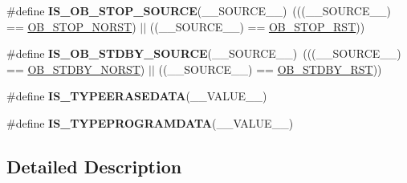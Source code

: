 \begin{DoxyCompactItemize}
\item 
\hypertarget{group___f_l_a_s_h_ex___private___macros_ga619ba079dedc08221f54a91a0fd84001}{\#define {\bfseries I\-S\-\_\-\-O\-B\-\_\-\-S\-T\-O\-P\-\_\-\-S\-O\-U\-R\-C\-E}(\-\_\-\-\_\-\-S\-O\-U\-R\-C\-E\-\_\-\-\_\-)~(((\-\_\-\-\_\-\-S\-O\-U\-R\-C\-E\-\_\-\-\_\-) == \hyperlink{group___f_l_a_s_h_ex___option___bytes__n_r_s_t___s_t_o_p_gac440badc145bc62ab85e1cbca9483584}{O\-B\-\_\-\-S\-T\-O\-P\-\_\-\-N\-O\-R\-S\-T}) $\vert$$\vert$ ((\-\_\-\-\_\-\-S\-O\-U\-R\-C\-E\-\_\-\-\_\-) == \hyperlink{group___f_l_a_s_h_ex___option___bytes__n_r_s_t___s_t_o_p_gaef92c03b1f279c532bfa13d3bb074b57}{O\-B\-\_\-\-S\-T\-O\-P\-\_\-\-R\-S\-T}))}\label{group___f_l_a_s_h_ex___private___macros_ga619ba079dedc08221f54a91a0fd84001}

\item 
\hypertarget{group___f_l_a_s_h_ex___private___macros_ga6bd789efc30c91a93b7d1acebdae4a21}{\#define {\bfseries I\-S\-\_\-\-O\-B\-\_\-\-S\-T\-D\-B\-Y\-\_\-\-S\-O\-U\-R\-C\-E}(\-\_\-\-\_\-\-S\-O\-U\-R\-C\-E\-\_\-\-\_\-)~(((\-\_\-\-\_\-\-S\-O\-U\-R\-C\-E\-\_\-\-\_\-) == \hyperlink{group___f_l_a_s_h_ex___option___bytes__n_r_s_t___s_t_d_b_y_ga001d8bed938edd0640f5461f859c57af}{O\-B\-\_\-\-S\-T\-D\-B\-Y\-\_\-\-N\-O\-R\-S\-T}) $\vert$$\vert$ ((\-\_\-\-\_\-\-S\-O\-U\-R\-C\-E\-\_\-\-\_\-) == \hyperlink{group___f_l_a_s_h_ex___option___bytes__n_r_s_t___s_t_d_b_y_ga69451a6f69247528f58735c9c83499ce}{O\-B\-\_\-\-S\-T\-D\-B\-Y\-\_\-\-R\-S\-T}))}\label{group___f_l_a_s_h_ex___private___macros_ga6bd789efc30c91a93b7d1acebdae4a21}

\item 
\#define {\bfseries I\-S\-\_\-\-T\-Y\-P\-E\-E\-R\-A\-S\-E\-D\-A\-T\-A}(\-\_\-\-\_\-\-V\-A\-L\-U\-E\-\_\-\-\_\-)
\item 
\#define {\bfseries I\-S\-\_\-\-T\-Y\-P\-E\-P\-R\-O\-G\-R\-A\-M\-D\-A\-T\-A}(\-\_\-\-\_\-\-V\-A\-L\-U\-E\-\_\-\-\_\-)
\end{DoxyCompactItemize}


\subsection{Detailed Description}


